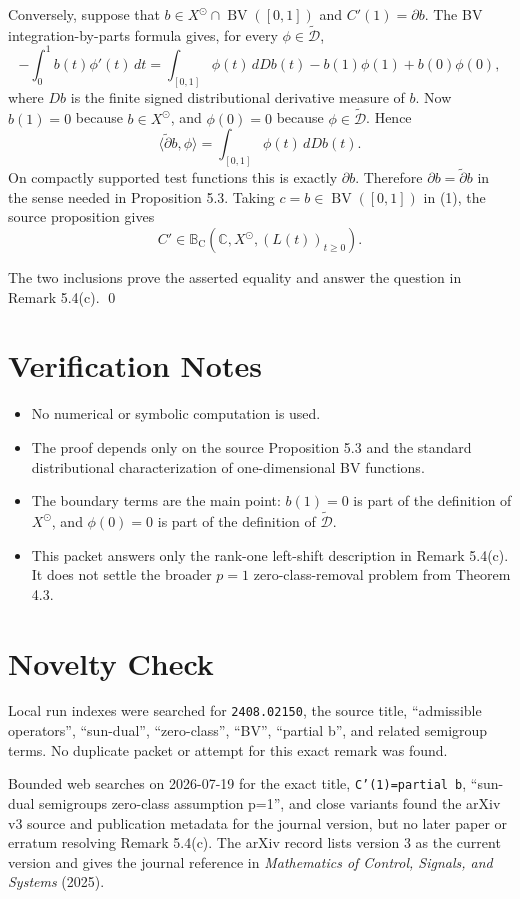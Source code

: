 \documentclass[11pt]{article}
\newcommand{\C}{\mathbb C}
\newcommand{\B}{\mathbb B}
\newcommand{\calD}{\mathcal D}
\newcommand{\BV}{\operatorname{BV}}
\newcommand{\sun}{\odot}
\newcommand{\dd}{\,d}
\newcommand{\widpartial}{\widetilde{\partial}}
\begin{document}
Conversely, suppose that $b\in X^\sun\cap\BV([0,1])$ and $C'(1)=\partial b$.  The BV integration-by-parts formula gives, for every $\phi\in\widetilde{\calD}$,
\[
  -\int_0^1 b(t)\phi'(t)\dd t
  = \int_{[0,1]}\phi(t)\dd Db(t)-b(1)\phi(1)+b(0)\phi(0),
\]
where $Db$ is the finite signed distributional derivative measure of $b$.  Now $b(1)=0$ because $b\in X^\sun$, and $\phi(0)=0$ because $\phi\in\widetilde{\calD}$.  Hence
\[
  \langle\widpartial b,\phi\rangle
  =
  \int_{[0,1]}\phi(t)\dd Db(t).
\]
On compactly supported test functions this is exactly $\partial b$.  Therefore $\partial b=\widpartial b$ in the sense needed in Proposition 5.3.  Taking $c=b\in\BV([0,1])$ in (1), the source proposition gives
\[
  C'\in \B_{\mathrm C}(\C,X^\sun,(L(t))_{t\ge0}).
\]

The two inclusions prove the asserted equality and answer the question in Remark 5.4(c). \qed

\section*{Verification Notes}

\begin{itemize}
\item No numerical or symbolic computation is used.
\item The proof depends only on the source Proposition 5.3 and the standard distributional characterization of one-dimensional BV functions.
\item The boundary terms are the main point: $b(1)=0$ is part of the definition of $X^\sun$, and $\phi(0)=0$ is part of the definition of $\widetilde{\calD}$.
\item This packet answers only the rank-one left-shift description in Remark 5.4(c). It does not settle the broader $p=1$ zero-class-removal problem from Theorem 4.3.
\end{itemize}

\section*{Novelty Check}

Local run indexes were searched for \texttt{2408.02150}, the source title, ``admissible operators'', ``sun-dual'', ``zero-class'', ``BV'', ``partial b'', and related semigroup terms. No duplicate packet or attempt for this exact remark was found.

Bounded web searches on 2026-07-19 for the exact title, \texttt{C'(1)=partial b}, ``sun-dual semigroups zero-class assumption p=1'', and close variants found the arXiv v3 source and publication metadata for the journal version, but no later paper or erratum resolving Remark 5.4(c). The arXiv record lists version 3 as the current version and gives the journal reference in \emph{Mathematics of Control, Signals, and Systems} (2025).
\end{document}

